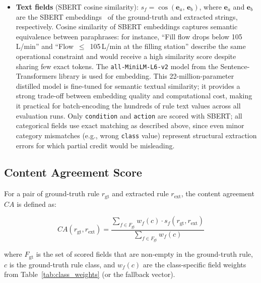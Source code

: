 ﻿\documentclass[11pt]{article}
\begin{document}
\begin{itemize}
\item \textbf{Text fields} (SBERT cosine similarity):
      $s_f = \cos(\mathbf{e}_a,\, \mathbf{e}_b)$,
      where $\mathbf{e}_a$ and $\mathbf{e}_b$ are the SBERT
      embeddings~\cite{reimers2019sbert} of the ground-truth and extracted
      strings, respectively.
      Cosine similarity of SBERT embeddings captures semantic equivalence
      between paraphrases: for instance, ``Fill flow drops below 105\,L/min''
      and ``Flow~$\leq$~105\,L/min at the filling station'' describe the same
      operational constraint and would receive a high similarity score despite
      sharing few exact tokens.
      The \texttt{all-MiniLM-L6-v2} model from the Sentence-Transformers library
      is used for embedding.
      This 22-million-parameter distilled model is fine-tuned for semantic
      textual similarity; it provides a strong trade-off between embedding quality
      and computational cost, making it practical for batch-encoding the hundreds
      of rule text values across all evaluation runs.
      Only \texttt{condition} and \texttt{action} are scored with SBERT;
      all categorical fields use exact matching as described above, since even
      minor category mismatches (e.g., wrong \texttt{class} value) represent
      structural extraction errors for which partial credit would be misleading.
\end{itemize}

\subsection{Content Agreement Score}
\label{sec:content_agreement}

For a pair of ground-truth rule $r_{\text{gt}}$ and extracted rule $r_{\text{ext}}$,
the content agreement $CA$ is defined as:

\begin{equation}
\label{eq:content_agreement}
CA(r_{\text{gt}}, r_{\text{ext}}) =
\frac{
  \displaystyle\sum_{f \in F_{\text{gt}}} w_f(c) \cdot s_f(r_{\text{gt}}, r_{\text{ext}})
}{
  \displaystyle\sum_{f \in F_{\text{gt}}} w_f(c)
}
\end{equation}

where $F_{\text{gt}}$ is the set of scored fields that are non-empty in the
ground-truth rule, $c$ is the ground-truth rule class, and $w_f(c)$ are the
class-specific field weights from Table~\ref{tab:class_weights} (or the fallback
vector).
\end{document}
